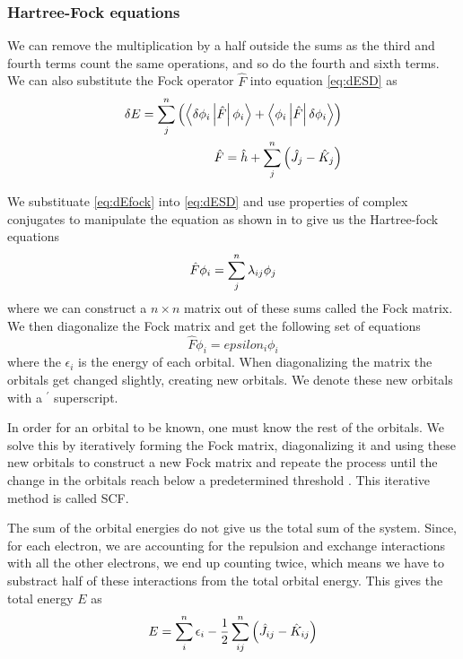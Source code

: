 \documentclass[../master_thesis.tex]{subfiles}
\begin{document}
\subsubsection{Hartree-Fock equations}
We can remove the multiplication by a half outside the sums as the third and fourth
terms count the same operations, and so do the fourth and sixth terms. We can also
substitute the Fock operator $\hat{F}$ into equation \ref{eq:dESD} as \cite{Jensen:2017}
\begin{align}\label{eq:dEfock}
  \delta E = \sumdef[n]{j}\left(\left\langle\delta\phi_i \left| \hat{F} \right| \phi_i \right\rangle + \left\langle\phi_i \left| \hat{F} \right| \delta\phi_i \right\rangle\right)\\\label{}
    \hat{F} = \hat{h} + \sumdef[n]{j}\left(\hat{J}_j - \hat{K}_j\right)
\end{align}

We substituate \ref{eq:dEfock} into \ref{eq:dESD} and use properties of complex conjugates
to manipulate the equation as shown in \cite{Jensen:2017} to give us the Hartree-fock
equations
\begin{equation}
\hat{F}\phi_i = \sumdef[n]{j}\lambda_{ij}\phi_j
\end{equation}
where we can construct a $n\times n$ matrix out of these sums called the Fock matrix.
We then diagonalize the Fock matrix and get the following set of \eival equations
\begin{equation}
\hat{F}\phi_i = epsilon_i\phi_i
\end{equation}
where the $\epsilon_i$ is the energy of each orbital. When diagonalizing the matrix the
orbitals get changed slightly, creating new orbitals. We denote these new orbitals with a $^\prime$
superscript.

In order for an orbital to be known, one must know the rest of the
orbitals. We solve this by iteratively forming the Fock matrix, diagonalizing it
and using these new orbitals to construct a new Fock matrix and repeate the
process until the change in the orbitals reach below a predetermined threshold
\cite{Helgaker:2012, Cramer:2004}. This iterative method is called \ac{SCF}.

The sum of the orbital energies do not give us the total sum of the system.
Since, for each electron,  we are accounting for the repulsion and exchange interactions with all the
other electrons, we end up counting twice, which means we have to substract half of
these interactions from the total orbital energy. This gives the total energy $E$ as
\cite{Jensen:2017}
\begin{equation}
  E = \sumdef[n]{i}\epsilon_i - \frac{1}{2}\sumdef[n]{ij}\left(\hat{J}_{ij} - \hat{K}_{ij}\right)
\end{equation}
\end{document}
